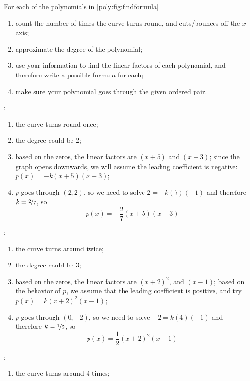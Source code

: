	 \investigation*{}
	 \begin{problem}
	 For each of the polynomials in \cref{poly:fig:findformula}
	 \begin{enumerate}
		 \item count the number of times the curve turns round, and cuts/bounces off the $x$ axis;
		 \item approximate the degree of the polynomial;
		 \item use your information to find the linear factors of each polynomial, and therefore write a possible formula for each;
		 \item make sure your polynomial goes through the given ordered pair.
	 \end{enumerate}
	 \begin{shortsolution}
		 :
		 \begin{enumerate}
			 \item the curve turns round once;
			 \item the degree could be 2;
			 \item based on the zeros, the linear factors are $(x+5)$ and $(x-3)$; since the
			       graph opens downwards, we will assume the leading coefficient is negative: $p(x)=-k(x+5)(x-3)$;
			 \item $p$ goes through $(2,2)$, so we need to solve $2=-k(7)(-1)$ and therefore $k=\nicefrac{2}{7}$, so
			       \[
				       p(x)=-\frac{2}{7}(x+5)(x-3)
			       \]
		 \end{enumerate}
		 :
		 \begin{enumerate}
			 \item the curve turns around twice;
			 \item the degree could be 3;
			 \item based on the zeros, the linear factors are $(x+2)^2$, and $(x-1)$;
			       based on the behavior of $p$, we assume that the leading coefficient is positive, and try $p(x)=k(x+2)^2(x-1)$;
			 \item $p$ goes through $(0,-2)$, so we need to solve $-2=k(4)(-1)$ and therefore $k=\nicefrac{1}{2}$, so
			       \[
				       p(x)=\frac{1}{2}(x+2)^2(x-1)
			       \]
		 \end{enumerate}
		 :
		 \begin{enumerate}
			 \item the curve turns around 4 times;

\end{enumerate}
\end{shortsolution}
\end{problem}

